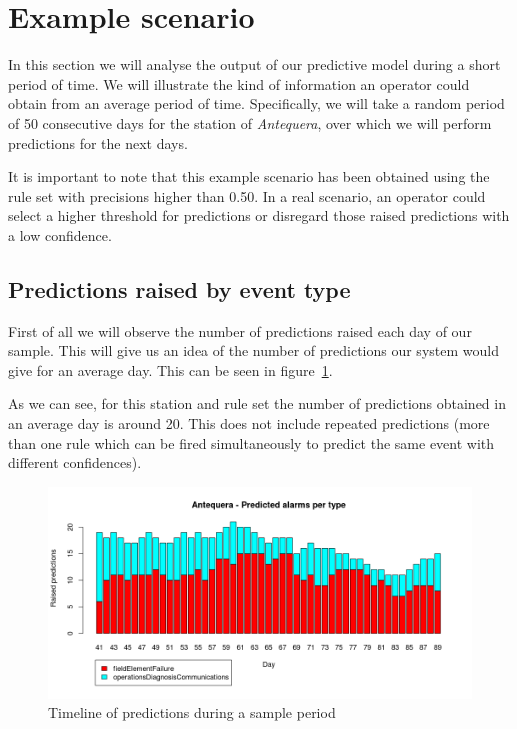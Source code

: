 \documentclass[a4paper,12pt]{article}
\begin{document}
\section{Example scenario}
\label{sec:scenario}

In this section we will analyse the output of our predictive model during a short period of time. We will illustrate the kind of information an operator could obtain from an average period of time. Specifically, we will take a random period of 50 consecutive days for the station of \emph{Antequera}, over which we will perform predictions for the next days.

It is important to note that this example scenario has been obtained using the rule set with precisions higher than 0.50. In a real scenario, an operator could select a higher threshold for predictions or disregard those raised predictions with a low confidence.

\subsection{Predictions raised by event type}
First of all we will observe the number of predictions raised each day of our sample. This will give us an idea of the number of predictions our system would give for an average day. This can be seen in figure~\ref{fig:scenario_pred_categories}.

As we can see, for this station and rule set the number of predictions obtained in an average day is around 20. This does not include repeated predictions (more than one rule which can be fired simultaneously to predict the same event with different confidences).

\begin{figure}[hbtp]
\includegraphics[width=\textwidth]{img/scenario_pred_categories.png}
\caption{Timeline of predictions during a sample period} \label{fig:scenario_pred_categories}
\end{figure}
\end{document}

